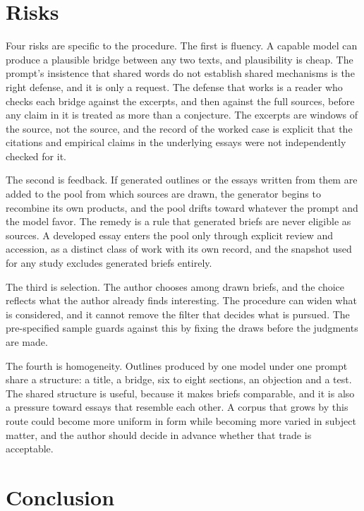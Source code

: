 \documentclass[11pt]{article}
\begin{document}
\section{Risks}

Four risks are specific to the procedure. The first is fluency. A capable model can produce a plausible bridge between any two texts, and plausibility is cheap. The prompt's insistence that shared words do not establish shared mechanisms is the right defense, and it is only a request. The defense that works is a reader who checks each bridge against the excerpts, and then against the full sources, before any claim in it is treated as more than a conjecture. The excerpts are windows of the source, not the source, and the record of the worked case is explicit that the citations and empirical claims in the underlying essays were not independently checked for it.

The second is feedback. If generated outlines or the essays written from them are added to the pool from which sources are drawn, the generator begins to recombine its own products, and the pool drifts toward whatever the prompt and the model favor. The remedy is a rule that generated briefs are never eligible as sources. A developed essay enters the pool only through explicit review and accession, as a distinct class of work with its own record, and the snapshot used for any study excludes generated briefs entirely.

The third is selection. The author chooses among drawn briefs, and the choice reflects what the author already finds interesting. The procedure can widen what is considered, and it cannot remove the filter that decides what is pursued. The pre-specified sample guards against this by fixing the draws before the judgments are made.

The fourth is homogeneity. Outlines produced by one model under one prompt share a structure: a title, a bridge, six to eight sections, an objection and a test. The shared structure is useful, because it makes briefs comparable, and it is also a pressure toward essays that resemble each other. A corpus that grows by this route could become more uniform in form while becoming more varied in subject matter, and the author should decide in advance whether that trade is acceptable.

\section{Conclusion}
\end{document}
